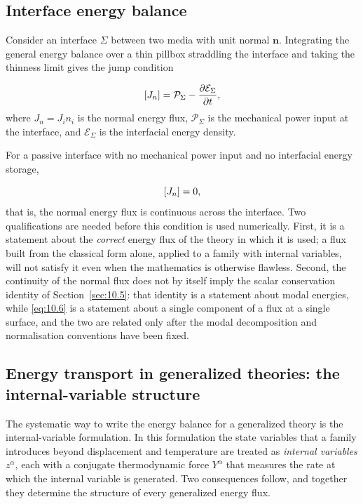 \subsection{Interface energy balance}
\label{sec:10.3}

Consider an interface $\Sigma$ between two media with unit normal $\bm{n}$. Integrating the general energy balance over a thin pillbox straddling the interface and taking the thinness limit gives the jump condition

\begin{equation}
\left[ J_n \right] = \mathcal{P}_\Sigma - \frac{\partial\mathcal{E}_\Sigma}{\partial t},
\label{eq:10.5}
\end{equation}
where $J_n = J_i n_i$ is the normal energy flux, $\mathcal{P}_\Sigma$ is the mechanical power input at the interface, and $\mathcal{E}_\Sigma$ is the interfacial energy density.

For a passive interface with no mechanical power input and no interfacial energy storage,

\begin{equation}
\left[ J_n \right] = 0,
\label{eq:10.6}
\end{equation}
that is, the normal energy flux is continuous across the interface. Two qualifications are needed before this condition is used numerically. First, it is a statement about the \emph{correct} energy flux of the theory in which it is used; a flux built from the classical form alone, applied to a family with internal variables, will not satisfy it even when the mathematics is otherwise flawless. Second, the continuity of the normal flux does not by itself imply the scalar conservation identity of Section~\ref{sec:10.5}: that identity is a statement about modal energies, while \eqref{eq:10.6} is a statement about a single component of a flux at a single surface, and the two are related only after the modal decomposition and normalisation conventions have been fixed.

\subsection{Energy transport in generalized theories: the internal-variable structure}
\label{sec:10.4}

The systematic way to write the energy balance for a generalized theory is the internal-variable formulation. In this formulation the state variables that a family introduces beyond displacement and temperature are treated as \emph{internal variables} $z^\alpha$, each with a conjugate thermodynamic force $Y^\alpha$ that measures the rate at which the internal variable is generated. Two consequences follow, and together they determine the structure of every generalized energy flux.


